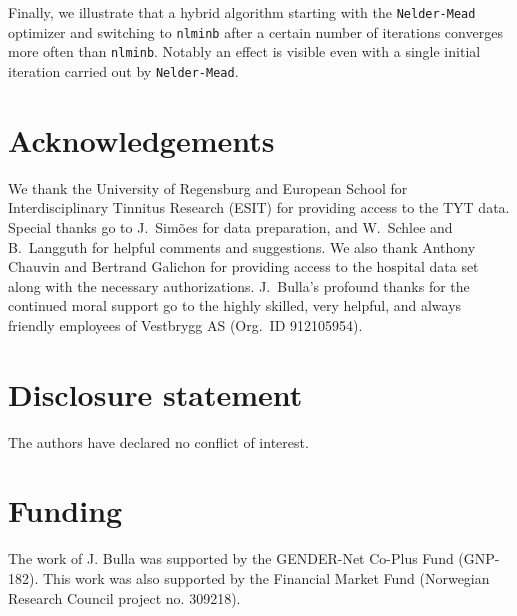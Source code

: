 \documentclass[]{interact}\usepackage[]{graphicx}\usepackage[dvipsnames]{xcolor}
\theoremstyle{plain}%
\theoremstyle{definition}
\theoremstyle{remark}
\begin{document}
Finally, we illustrate that a hybrid algorithm starting with the \texttt{Nelder-Mead} optimizer and switching to \texttt{nlminb} after a certain number of iterations converges more often than {\tt{nlminb}}. Notably an effect is visible even with a single initial iteration carried out by \texttt{Nelder-Mead}. 

 \clearpage



\section*{Acknowledgements}
We thank the University of Regensburg and European School for Interdisciplinary Tinnitus Research (ESIT) for providing access to the TYT data. Special thanks go to J.~Sim\~{o}es for data preparation, and W.~Schlee and B.~Langguth for helpful comments and suggestions. We also thank Anthony Chauvin and Bertrand Galichon for providing access to the hospital data set along with the necessary authorizations. J.~Bulla's profound thanks for the continued moral support go to the highly skilled, very helpful, and always friendly employees of Vestbrygg AS (Org.~ID 912105954).
\vspace*{1pc}


\section*{Disclosure statement}

The authors have declared no conflict of interest.

\section*{Funding}

The work of J. Bulla was supported by the GENDER-Net Co-Plus Fund (GNP-182). This work was also supported by the Financial Market Fund (Norwegian Research Council project no. 309218).



% 


\end{document}
